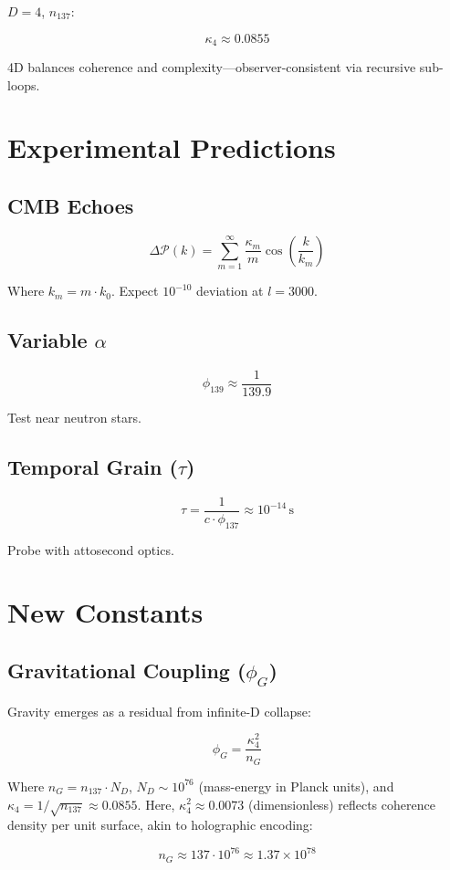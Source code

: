 \documentclass[12pt]{article}
\begin{document}
\(D = 4\), \(n_{137}\):

\[
\kappa_4 \approx 0.0855
\]

4D balances coherence and complexity—observer-consistent via recursive sub-loops.

\section{Experimental Predictions}

\subsection{CMB Echoes}
\[
\Delta \mathcal{P}(k) = \sum_{m=1}^\infty \frac{\kappa_m}{m} \cos\left(\frac{k}{k_m}\right)
\]

Where \(k_m = m \cdot k_0\). Expect \(10^{-10}\) deviation at \(l = 3000\).

\subsection{Variable \(\alpha\)}
\[
\phi_{139} \approx \frac{1}{139.9}
\]

Test near neutron stars.

\subsection{Temporal Grain (\(\tau\))}
\[
\tau = \frac{1}{c \cdot \phi_{137}} \approx 10^{-14} \, \text{s}
\]

Probe with attosecond optics.

\section{New Constants}

\subsection{Gravitational Coupling (\(\phi_G\))}
Gravity emerges as a residual from infinite-D collapse:

\[
\phi_G = \frac{\kappa_4^2}{n_G}
\]

Where \(n_G = n_{137} \cdot N_D\), \(N_D \sim 10^{76}\) (mass-energy in Planck units), and \(\kappa_4 = 1/\sqrt{n_{137}} \approx 0.0855\). Here, \(\kappa_4^2 \approx 0.0073\) (dimensionless) reflects coherence density per unit surface, akin to holographic encoding:

\[
n_G \approx 137 \cdot 10^{76} \approx 1.37 \times 10^{78}
\]
\end{document}
